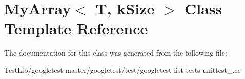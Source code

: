 \hypertarget{classMyArray}{}\section{My\+Array$<$ T, k\+Size $>$ Class Template Reference}
\label{classMyArray}


The documentation for this class was generated from the following file\+:\begin{DoxyCompactItemize}
\item 
Test\+Lib/googletest-\/master/googletest/test/googletest-\/list-\/tests-\/unittest\+\_\+.\+cc\end{DoxyCompactItemize}

